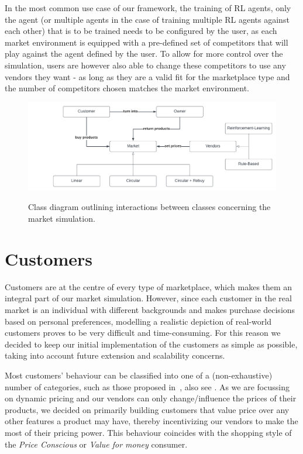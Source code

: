 In the most common use case of our framework, the training of RL agents, only the agent (or multiple agents in the case of training multiple RL agents against each other) that is to be trained needs to be configured by the user, as each market environment is equipped with a pre-defined set of competitors that will play against the agent defined by the user. To allow for more control over the simulation, users are however also able to change these competitors to use any vendors they want - as long as they are a valid fit for the marketplace type and the number of competitors chosen matches the market environment.

\begin{figure}[t]
	\centering
	\includegraphics[width = \textwidth]{images/overview_diagram.pdf}\\
	\caption{Class diagram outlining interactions between classes concerning the market simulation.}\label{fig:OverviewDiagram}
\end{figure}

\section{Customers}\label{sec:Customers}

Customers are at the centre of every type of marketplace, which makes them an integral part of our market simulation. However, since each customer in the real market is an individual with different backgrounds and makes purchase decisions based on personal preferences, modelling a realistic depiction of real-world customers proves to be very difficult and time-consuming. For this reason we decided to keep our initial implementation of the customers as simple as possible, taking into account future extension and scalability concerns.

Most customers' behaviour can be classified into one of a (non-exhaustive) number of categories, such as those proposed in~\cite{ShoppingStyles}, also see . As we are focussing on dynamic pricing and our vendors can only change/influence the prices of their products, we decided on primarily building customers that value price over any other features a product may have, thereby incentivizing our vendors to make the most of their pricing power. This behaviour coincides with the shopping style of the \emph{Price Conscious} or \emph{Value for money} consumer.

